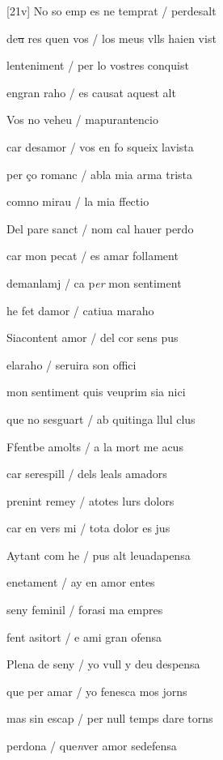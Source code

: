 \documentclass[12pt]{article}
\begin{document}
\begin{estrofa}

 [21v] No so emp es ne temprat / perdesalt

 de\sout{u} res quen vos / los meus vlls haien vist

 lenteniment / per lo vostres conquist

 engran raho / es causat aquest alt

 Vos no veheu / mapurantencio

 car desamor / vos en fo squeix lavista

 per \c{c}o romanc / abla mia arma trista

 comno mirau / la mia ffectio

\end{estrofa}



\begin{estrofa}

 Del pare sanct / nom cal hauer perdo

 car mon pecat / es amar follament

 demanlamj / ca p\textit{er} mon sentiment

 he fet damor / catiua maraho

 Siacontent amor / del cor sens pus

 elaraho / seruira son offici

 mon sentiment quis veuprim sia nici

 que no sesguart / ab quitinga llul clus

\end{estrofa}



\begin{estrofa}

 Ffentbe amolts / a la mort me acus

 car serespill / dels leals amadors

 prenint remey / atotes lurs dolors

 car en vers mi / tota dolor es jus

 Aytant com he / pus alt leuadapensa

 enetament / ay en amor entes

 seny feminil / forasi ma empres

 fent asitort / e ami gran ofensa

\end{estrofa}



\begin{estrofa}

 Plena de seny / yo vull y deu despensa

 que per amar / yo fenesca mos jorns

 mas sin escap / per null temps dare torns

 perdona / que\textit{n}ver amor sedefensa

\end{estrofa}
\end{document}
